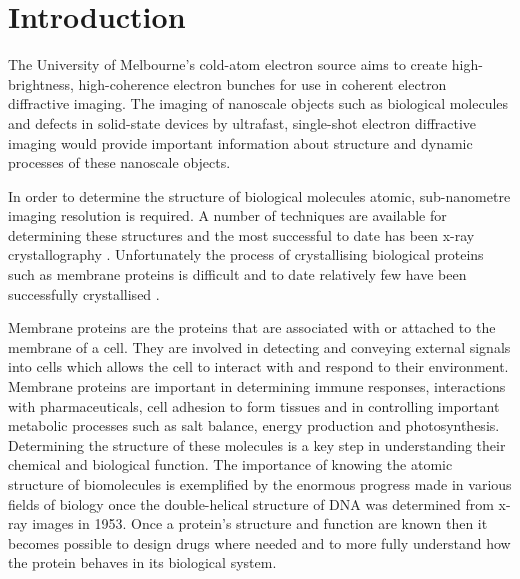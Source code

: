 \chapter{Introduction}

The University of Melbourne's cold-atom electron source aims to create high-brightness, high-coherence electron bunches for use in coherent electron diffractive imaging. The imaging of nanoscale objects such as biological molecules\cite{dwyer_femtosecond_2006, williamson_clocking_1997} and defects in solid-state devices\cite{siwick_atomic-level_2003} by ultrafast, single-shot electron diffractive imaging would provide important information about structure and dynamic processes of these nanoscale objects.

In order to determine the structure of biological molecules atomic, sub-nanometre imaging resolution is required. A number of techniques are available for determining these structures \cite{nettleship_methods_2008, svergun_small-angle_2003, opella_structure_2004} and the most successful to date has been x-ray crystallography \cite{kendrew_three-dimensional_1958, uson_advances_1999}. Unfortunately the process of crystallising biological proteins such as membrane proteins is difficult and to date relatively few have been successfully crystallised \cite{geerlof_impact_2006}.

Membrane proteins are the proteins that are associated with or attached to the membrane of a cell. They are involved in detecting and conveying external signals into cells which allows the cell to interact with and respond to their environment\cite{almen_mapping_2009}. Membrane proteins are important in determining immune responses, interactions with pharmaceuticals, cell adhesion to form tissues and in controlling important metabolic processes such as salt balance, energy production and photosynthesis\cite{chiras_human_2011}. Determining the structure of these molecules is a key step in understanding their chemical and biological function. The importance of knowing the atomic structure of biomolecules is exemplified by the enormous progress made in various fields of biology once the double-helical structure of DNA was determined from x-ray images in 1953\cite{watson_molecular_1953}. Once a protein's structure and function are known then it becomes possible to design drugs\cite{pinto_influenza_1992} where needed and to more fully understand how the protein behaves in its biological system.

